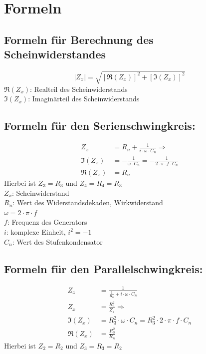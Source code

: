 \documentclass[fontsize=12pt]{scrartcl}
\begin{document}
\section{ Formeln}

\subsection{Formeln für Berechnung des Scheinwiderstandes}

\begin{equation}
|Z_{x}|= \sqrt{[\Re(Z_{x})]^2 +[\Im(Z_{x})]^2}
\end{equation}
\noindent
$\Re(Z_{x})$: 	Realteil des Scheinwiderstands \\
$\Im(Z_{x})$:	Imaginärteil des Scheinwiderstands \\


\subsection{Formeln für den Serienschwingkreis:}
\begin{align}
Z_x &=R_n + \frac{1}{i \cdot \omega \cdot C_{n}} \Longrightarrow \\
\Im(Z_{x})&= - \frac{1}{\omega \cdot C_{n}} = - \frac{1}{2 \cdot \pi \cdot f \cdot C_{n}} \\
\Re(Z_x) &= R_n
\end{align}
Hierbei ist $Z_{3}=R_{3}$ und $Z_{4}=R_{4}=R_{3}$\\
$Z_{x}$: 	Scheinwiderstand \\
$R_{n}$: 	Wert des Widerstandsdekaden, Wirkwiderstand \\
$\omega = 	2 \cdot \pi \cdot f $ \\
$f$: 		Frequenz des Generators \\
$i$: 		komplexe Einheit, $i^{2}=-1$ \\
$C_{n}$: 	Wert des Stufenkondensator \\
\subsection{Formeln für den Parallelschwingkreis:}
\begin{align}
Z_{4} &= \frac{1}{ \frac{1}{R_{n}}+i \cdot \omega \cdot C_{n}} \\
Z_x&= \frac{R^2_3}{Z_4} \Longrightarrow \\
\Im(Z_x) &= R^2_3 \cdot \omega \cdot C_n = R^2_3 \cdot 2 \cdot \pi \cdot f \cdot C_n \\
\Re(Z_x) &= \frac{R^2_3}{R_n}
\end{align}
Hierbei ist $Z_{2}=R_{2}$ und $Z_{3}=R_{3}=R_{2}$
\end{document}
